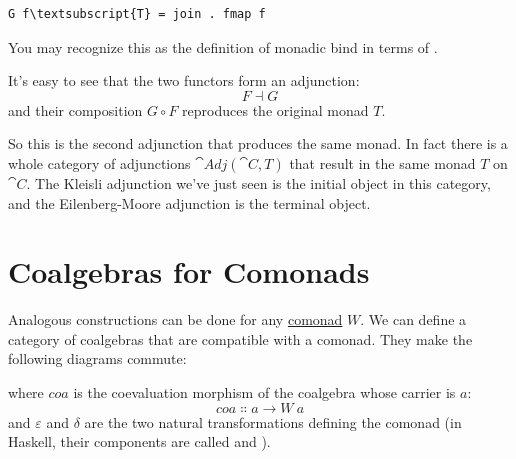 \begin{Verbatim}[commandchars=\\\{\}]
G f\textsubscript{T} = join . fmap f
\end{Verbatim}
You may recognize this as the definition of monadic bind in terms of
.

It's easy to see that the two functors form an adjunction:
\[F \dashv G\]
and their composition $G \circ F$ reproduces the original monad $T$.

So this is the second adjunction that produces the same monad. In fact
there is a whole category of adjunctions $\cat{Adj}(\cat{C}, T)$ that result
in the same monad $T$ on $\cat{C}$. The Kleisli adjunction we've
just seen is the initial object in this category, and the
Eilenberg-Moore adjunction is the terminal object.

\section{Coalgebras for Comonads}

Analogous constructions can be done for any
\hyperref[comonads]{comonad}
$W$. We can define a category of coalgebras that are compatible
with a comonad. They make the following diagrams commute:

\begin{figure}[H]
  \centering
  \begin{subfigure}
    \centering
  \end{subfigure}%
  \hspace{1cm}
  \begin{subfigure}
    \centering
  \end{subfigure}
\end{figure}

\noindent
where $coa$ is the coevaluation morphism of the coalgebra whose
carrier is $a$:
\[coa \Colon a \to W\ a\]
and $\varepsilon$ and $\delta$ are the two natural transformations
defining the comonad (in Haskell, their components are called
 and ).

